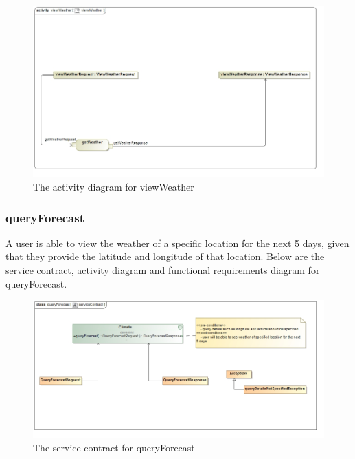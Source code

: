 \begin{figure}[H]
	\centering
	\includegraphics[width=1.0\textwidth]{../images/funcReq/viewWeatherActivityDiagram.jpg}
	\caption{The activity diagram for viewWeather \label{overflow}}
\end{figure}

\subsubsection{queryForecast}

A user is able to view the weather of a specific location for the next 5 days, given that they provide the latitude and longitude of that location.  Below are the service contract, activity diagram and functional requirements diagram for queryForecast.

\begin{figure}[H]
	\centering
	\includegraphics[width=1.0\textwidth]{../images/funcReq/queryForecastServiceContract.jpg}
	\caption{The service contract for queryForecast \label{overflow}}
\end{figure}

